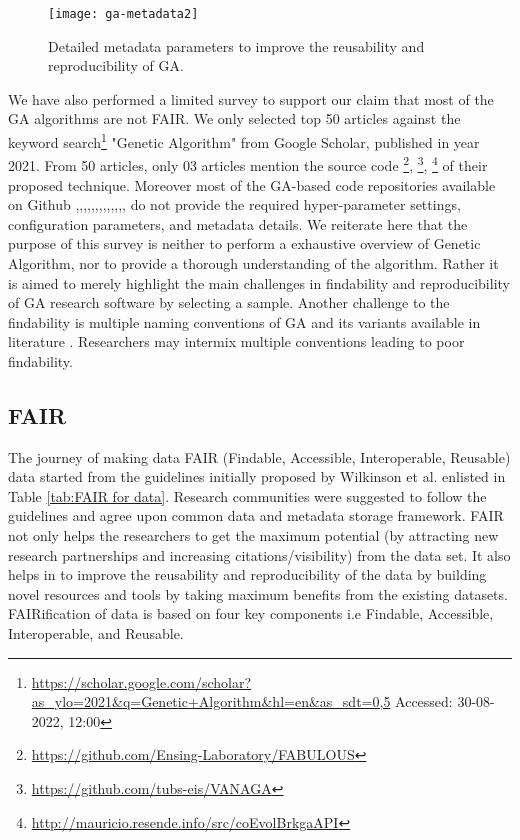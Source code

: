 \documentclass[preprint,12pt]{elsarticle}
\begin{document}

\begin{figure}[!htb]
\centering
\texttt{[image: ga-metadata2]}
\caption{Detailed metadata parameters  to improve the reusability and reproducibility of GA. }
\label{fig:detailed-metadata}
\end{figure}

We have also performed a limited survey to support our claim that most of the GA algorithms are not FAIR. We only selected top 50 articles against the keyword search\footnote{\url{https://scholar.google.com/scholar?as_ylo=2021&q=Genetic+Algorithm&hl=en&as_sdt=0,5} Accessed: 30-08-2022, 12:00} "Genetic Algorithm" from Google Scholar, published in year 2021. From 50 articles, only 03 articles \cite{weissbrich2021using, oliveira2021c++, hooft2021discovering}  mention the source code \footnote{\url{https://github.com/Ensing-Laboratory/FABULOUS}}, \footnote{\url{https://github.com/tubs-eis/VANAGA}}, \footnote{\url{http://mauricio.resende.info/src/coEvolBrkgaAPI}} of their proposed technique. Moreover most of the GA-based code repositories available on Github ,,,,,,,,,,,,, do not provide the required hyper-parameter settings, configuration parameters, and metadata details. We reiterate here that the purpose of this survey is neither to perform a exhaustive overview of Genetic Algorithm, nor to provide a thorough understanding of the algorithm. Rather it is aimed  to merely highlight the main challenges in findability and reproducibility of GA research software by selecting a sample. Another challenge to the findability is multiple naming conventions of GA and its variants available in literature \cite{oliveira2021c++, hooft2021discovering}. Researchers may intermix multiple conventions leading to poor findability.


\subsection{FAIR}
The journey of making data FAIR (Findable, Accessible, Interoperable, Reusable) data started from the guidelines initially proposed by Wilkinson et al. \cite{wilkinson2016FAIR} enlisted in Table \ref{tab:FAIR for data}. Research communities were suggested to follow the guidelines and agree upon common data and metadata storage framework. FAIR not only helps the researchers to get the maximum potential (by attracting new research partnerships and increasing  citations/visibility) from the data set. It also helps in to improve the reusability and reproducibility of the data by building novel resources and tools by taking maximum benefits from the existing datasets. FAIRification of data is based on four key components i.e Findable, Accessible, Interoperable, and Reusable.\\
\end{document}
